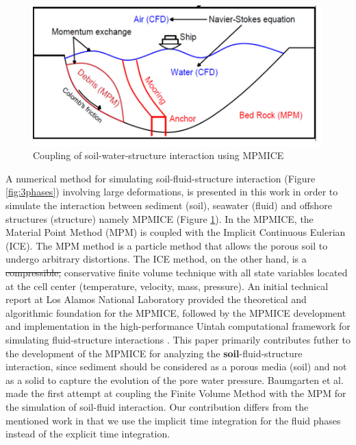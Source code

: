 \documentclass[preprint,12pt]{elsarticle}
\providecommand{\DIFdel}[1]{{\protect\color{red}\sout{#1}}}                      %
\providecommand{\DIFdelbegin}{} %
\providecommand{\DIFdelend}{} %
\newcommand{\DIFscaledelfig}{0.5}
\newlength{\DIFdelgraphicswidth} %
\newlength{\DIFdelgraphicsheight} %
\newcommand{\DIFdelincludegraphics}[2][]{%
\sbox{\DIFdelgraphicsbox}{\DIFOincludegraphics[#1]{#2}}%
\settoboxwidth{\DIFdelgraphicswidth}{\DIFdelgraphicsbox} %
\settoboxtotalheight{\DIFdelgraphicsheight}{\DIFdelgraphicsbox} %
\scalebox{\DIFscaledelfig}{%
\parbox[b]{\DIFdelgraphicswidth}{\usebox{\DIFdelgraphicsbox}\\[-\baselineskip] \rule{\DIFdelgraphicswidth}{0em}}\llap{\resizebox{\DIFdelgraphicswidth}{\DIFdelgraphicsheight}{%
\setlength{\unitlength}{\DIFdelgraphicswidth}%
\begin{picture}(1,1)%
\thicklines\linethickness{2pt} %
{\color[rgb]{1,0,0}\put(0,0){\framebox(1,1){}}}%
{\color[rgb]{1,0,0}\put(0,0){\line( 1,1){1}}}%
{\color[rgb]{1,0,0}\put(0,1){\line(1,-1){1}}}%
\end{picture}%
}\hspace*{3pt}}} %
} %
\DeclareRobustCommand{\DIFdelbegin}{\DIFOdelbegin \let\includegraphics\DIFdelincludegraphics} %
\DeclareRobustCommand{\DIFdelend}{\DIFOaddend \let\includegraphics\DIFOincludegraphics} %
\begin{document}
%
%
\begin{figure}[h]
\center
\includegraphics[scale=.4]{MPMICE.jpg}
\caption{Coupling of soil-water-structure interaction using MPMICE}
\label{fig:MPMICE}
\end{figure}
%
%

A numerical method for simulating soil-fluid-structure interaction (Figure \ref{fig:3phases}) involving large deformations, is presented in this work in order to simulate the interaction between sediment (soil), seawater (fluid) and offshore structures (structure) namely MPMICE (Figure \ref{fig:MPMICE}). In the MPMICE, the Material Point Method (MPM) is coupled with the Implicit Continuous Eulerian (ICE). The MPM method is a particle method that allows the porous soil to undergo arbitrary distortions. The ICE method, on the other hand, is a \DIFdelbegin \DIFdel{compressible, }\DIFdelend conservative finite volume technique with all state variables located at the cell center (temperature, velocity, mass, pressure). An initial technical report \cite{Kashiwa} at Los Alamos National Laboratory provided the theoretical and algorithmic foundation for the MPMICE, followed by the MPMICE development and implementation in the high-performance Uintah computational framework for simulating fluid-structure interactions \cite{MPMICE}. This paper primarily contributes futher to the development of the MPMICE for analyzing the \textbf{soil}-fluid-structure interaction, since sediment should be considered as a porous media (soil) and not as a solid to capture the evolution of the pore water pressure. Baumgarten et al. \cite{Baumgarten2021} made the first attempt at coupling the Finite Volume Method with the MPM for the simulation of soil-fluid interaction. Our contribution differs from the mentioned work in that we use the implicit time integration for the fluid phases instead of the explicit time integration.

\end{document}

